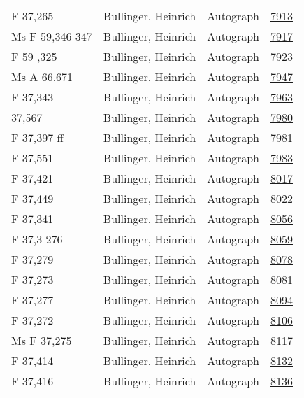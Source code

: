 \documentclass[10pt,a4paper,landscape]{report}
\begin{document}
\begin{longtable}{p{16cm}p{4cm}lr}
F 37,265	&	Bullinger, Heinrich	&	Autograph	&	\href{http://130.60.24.72/assignment/7913}{7913}\\
Ms F 59,346-347	&	Bullinger, Heinrich	&	Autograph	&	\href{http://130.60.24.72/assignment/7917}{7917}\\
F 59 ,325	&	Bullinger, Heinrich	&	Autograph	&	\href{http://130.60.24.72/assignment/7923}{7923}\\
Ms A 66,671	&	Bullinger, Heinrich	&	Autograph	&	\href{http://130.60.24.72/assignment/7947}{7947}\\
F 37,343	&	Bullinger, Heinrich	&	Autograph	&	\href{http://130.60.24.72/assignment/7963}{7963}\\
37,567	&	Bullinger, Heinrich	&	Autograph	&	\href{http://130.60.24.72/assignment/7980}{7980}\\
F 37,397 ff	&	Bullinger, Heinrich	&	Autograph	&	\href{http://130.60.24.72/assignment/7981}{7981}\\
F 37,551	&	Bullinger, Heinrich	&	Autograph	&	\href{http://130.60.24.72/assignment/7983}{7983}\\
F 37,421	&	Bullinger, Heinrich	&	Autograph	&	\href{http://130.60.24.72/assignment/8017}{8017}\\
F 37,449	&	Bullinger, Heinrich	&	Autograph	&	\href{http://130.60.24.72/assignment/8022}{8022}\\
F 37,341	&	Bullinger, Heinrich	&	Autograph	&	\href{http://130.60.24.72/assignment/8056}{8056}\\
F 37,3 276	&	Bullinger, Heinrich	&	Autograph	&	\href{http://130.60.24.72/assignment/8059}{8059}\\
F 37,279	&	Bullinger, Heinrich	&	Autograph	&	\href{http://130.60.24.72/assignment/8078}{8078}\\
F 37,273	&	Bullinger, Heinrich	&	Autograph	&	\href{http://130.60.24.72/assignment/8081}{8081}\\
F 37,277	&	Bullinger, Heinrich	&	Autograph	&	\href{http://130.60.24.72/assignment/8094}{8094}\\
F 37,272	&	Bullinger, Heinrich	&	Autograph	&	\href{http://130.60.24.72/assignment/8106}{8106}\\
Ms F 37,275	&	Bullinger, Heinrich	&	Autograph	&	\href{http://130.60.24.72/assignment/8117}{8117}\\
F 37,414	&	Bullinger, Heinrich	&	Autograph	&	\href{http://130.60.24.72/assignment/8132}{8132}\\
F 37,416	&	Bullinger, Heinrich	&	Autograph	&	\href{http://130.60.24.72/assignment/8136}{8136}\\

\end{longtable}
\end{document}
